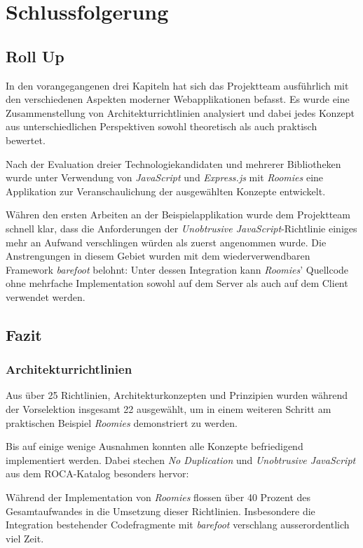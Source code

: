 \chapter{Schlussfolgerung}

\section*{Roll Up}

In den vorangegangenen drei Kapiteln hat sich das Projektteam ausführlich mit den verschiedenen Aspekten moderner Webapplikationen befasst. Es wurde eine Zusammenstellung von Architekturrichtlinien analysiert und dabei jedes Konzept aus unterschiedlichen Perspektiven sowohl theoretisch als auch praktisch bewertet.

Nach der Evaluation dreier Technologiekandidaten und mehrerer Bibliotheken wurde unter Verwendung von \emph{JavaScript} und \emph{Express.js} mit \emph{Roomies} eine Applikation zur Veranschaulichung der ausgewählten Konzepte entwickelt.

Währen den ersten Arbeiten an der Beispielapplikation wurde dem Projektteam schnell klar, dass die Anforderungen der \emph{Unobtrusive JavaScript}-Richtlinie einiges mehr an Aufwand verschlingen würden als zuerst angenommen wurde. Die Anstrengungen in diesem Gebiet wurden mit dem wiederverwendbaren Framework \emph{barefoot} belohnt: Unter dessen Integration kann \emph{Roomies}' Quellcode ohne mehrfache Implementation sowohl auf dem Server als auch auf dem Client verwendet werden.


\section*{Fazit}


\subsection*{Architekturrichtlinien}

Aus über 25 Richtlinien, Architekturkonzepten und Prinzipien wurden während der Vorselektion insgesamt 22 ausgewählt, um in einem weiteren Schritt am praktischen Beispiel \emph{Roomies} demonstriert zu werden.

Bis auf einige wenige Ausnahmen konnten alle Konzepte befriedigend implementiert werden. Dabei stechen \emph{No Duplication} und \emph{Unobtrusive JavaScript} aus dem ROCA-Katalog besonders hervor:

Während der Implementation von \emph{Roomies} flossen über 40 Prozent des Gesamtaufwandes in die Umsetzung dieser Richtlinien. Insbesondere die Integration bestehender Codefragmente mit \emph{barefoot} verschlang ausserordentlich viel Zeit.

